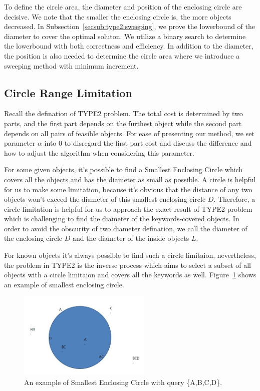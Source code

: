 \documentclass{sig-alternate}
\newcounter{example}[section]
\begin{document}
To define the circle area, the diameter and position of the enclosing circle are decisive.
We note that the smaller the enclosing circle is, the more objects decreased.
In Subsection~\ref{secsub:type2:sweeping},
we prove the lowerbound of the diameter to cover the optimal soluton. We utilize
a binary search to determine the lowerbound with both correctness and efficiency.
In addition to the diameter, the position is also needed to determine the circle area
where we introduce a sweeping method with minimum increment.
%

\subsection{Circle Range Limitation} \label{secsub:type2:limitation}
Recall the defination of \textsf{TYPE2} problem. The total cost is determined
by two parts, and the first part depends on the furthest object while
the second part depends on all pairs of feasible objects.
For ease of presenting our method, we set parameter $\alpha$ into 0
to disregard the first part cost and discuss the difference and how to adjust the
algorithm when considering this parameter.\par
%
For some given objects, it's possible to find a \textsf{Smallest Enclosing Circle}
which covers all the objects and has the diameter as small as possible. A circle is
helpful for us to make some limitation, because it's obvious that the distance of
any two objects won't exceed the diameter of this smallest enclosing circle $D$.
Therefore, a circle limitation is helpful for us to approach the exact result
of \textsf{TYPE2} problem which is challenging to find the diameter of the keywords-covered
objects. In order to avoid the obscurity of two diameter defination, we call the
diameter of the enclosing circle $D$ and the diameter of the inside objects $L$.\par
%

For known objects it's always possible to find such a circle limitaion,
nevertheless, the problem in \textsf{TYPE2} is the inverse process which aims to
select a subset of all objects with a circle limitaion and covers all the
keywords as well. Figure~\ref{fig:1} shows an example of smallest enclosing circle.

\begin{figure}\label{fig:1}
\begin{center}
\includegraphics[width=2.5in]{figure/fig1}
\caption{An example of Smallest Enclosing Circle with query \{A,B,C,D\}.}
\end{center}
\end{figure}
\end{document}
